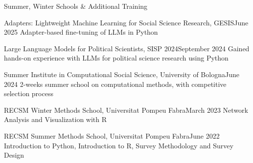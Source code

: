 \documentclass{cv} %
\begin{document}

\begin{rSection}{Summer, Winter Schools \& Additional Training}

    \begin{rTrainingSubsection}{Adapters: Lightweight Machine Learning for Social Science Research, GESIS}{June 2025}
    {Adapter-based fine-tuning of LLMs in Python}
    \end{rTrainingSubsection}

    \begin{rTrainingSubsection}{Large Language Models for Political Scientists, SISP 2024}{September 2024}
    {Gained hands-on experience with LLMs for political science research using Python}
    \end{rTrainingSubsection}
    
    \begin{rTrainingSubsection}{Summer Institute in Computational Social Science, University of Bologna}{June 2024}
    {2-weeks summer school on computational methods, with competitive selection process}
    \end{rTrainingSubsection}
    
    \begin{rTrainingSubsection}{RECSM Winter Methods School, Universitat Pompeu Fabra}{March 2023}
    {Network Analysis and Visualization with R}
    \end{rTrainingSubsection}
    
    \begin{rTrainingSubsection}{RECSM Summer Methods School, Universitat Pompeu Fabra}{June 2022}
    {Introduction to Python, Introduction to R, Survey Methodology and Survey Design} 
    \end{rTrainingSubsection}
    
\end{rSection}
     
\end{document}
